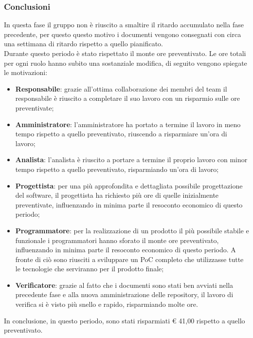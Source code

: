 \documentclass[../piano_di_progetto.tex]{subfiles}
\begin{document}
\subsubsection{Conclusioni}%
\label{sub:cons_con_3}
In questa fase il gruppo non è riuscito a smaltire il ritardo accumulato nella fase precedente, per questo questo motivo i documenti vengono consegnati con circa una settimana di ritardo rispetto a quello pianificato. \\
Durante questo periodo è stato rispettato il monte ore preventivato. Le ore totali per ogni ruolo hanno subito una sostanziale modifica, di seguito vengono spiegate le motivazioni:
\begin{itemize}
	\item \textbf{Responsabile}: grazie all'ottima collaborazione dei membri del team il responsabile è riuscito a completare il suo lavoro con un risparmio sulle ore preventivate;
	\item \textbf{Amministratore}: l'amministratore ha portato a termine il lavoro in meno tempo rispetto a quello preventivato, riuscendo a risparmiare un'ora di lavoro;
	\item \textbf{Analista}: l'analista è riuscito a portare a termine il proprio lavoro con minor tempo rispetto a quello preventivato, risparmiando un'ora di lavoro;
	\item \textbf{Progettista}: per una più approfondita e dettagliata possibile progettazione del software, il progettista ha richiesto più ore di quelle inizialmente preventivate, influenzando in minima parte il resoconto economico di questo periodo;
	\item \textbf{Programmatore}: per la realizzazione di un prodotto il più possibile stabile e funzionale i programmatori hanno sforato il monte ore preventivato, influenzando in minima parte il resoconto economico di questo periodo. A fronte di ciò sono riusciti a sviluppare un PoC completo che utilizzasse tutte le tecnologie che serviranno per il prodotto finale;
	\item \textbf{Verificatore}: grazie al fatto che i documenti sono stati ben avviati nella precedente fase e alla nuova amministrazione delle repository, il lavoro di verifica si è visto più snello e rapido, risparmiando molte ore.
\end{itemize} 
In conclusione, in questo periodo, sono stati risparmiati € 41,00 rispetto a quello preventivato.

\end{document}
